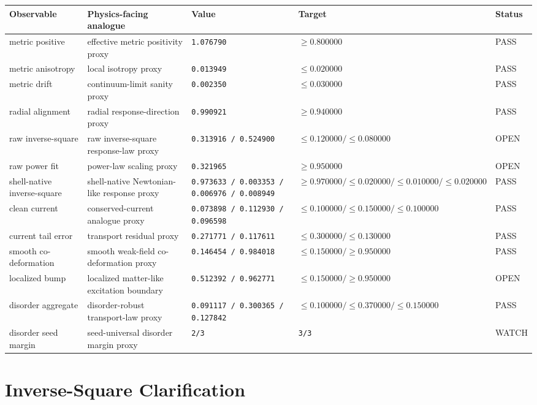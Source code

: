 \documentclass[11pt]{article}
\begin{document}
\begin{longtable}{@{}p{2.6cm}p{3.3cm}p{4.2cm}p{3.0cm}p{1.1cm}@{}}
\toprule
Observable & Physics-facing analogue & Value & Target & Status \\
\midrule
\endhead
metric positive & effective metric positivity proxy & \texttt{1.076790} & \(\ge 0.800000\) & PASS \\
metric anisotropy & local isotropy proxy & \texttt{0.013949} & \(\le 0.020000\) & PASS \\
metric drift & continuum-limit sanity proxy & \texttt{0.002350} & \(\le 0.030000\) & PASS \\
radial alignment & radial response-direction proxy & \texttt{0.990921} & \(\ge 0.940000\) & PASS \\
raw inverse-square & raw inverse-square response-law proxy & \texttt{0.313916 / 0.524900} & \(\le 0.120000 / \le 0.080000\) & OPEN \\
raw power fit & power-law scaling proxy & \texttt{0.321965} & \(\ge 0.950000\) & OPEN \\
shell-native inverse-square & shell-native Newtonian-like response proxy & \texttt{0.973633 / 0.003353 / 0.006976 / 0.008949} & \(\ge 0.970000 / \le 0.020000 / \le 0.010000 / \le 0.020000\) & PASS \\
clean current & conserved-current analogue proxy & \texttt{0.073898 / 0.112930 / 0.096598} & \(\le 0.100000 / \le 0.150000 / \le 0.100000\) & PASS \\
current tail error & transport residual proxy & \texttt{0.271771 / 0.117611} & \(\le 0.300000 / \le 0.130000\) & PASS \\
smooth co-deformation & smooth weak-field co-deformation proxy & \texttt{0.146454 / 0.984018} & \(\le 0.150000 / \ge 0.950000\) & PASS \\
localized bump & localized matter-like excitation boundary & \texttt{0.512392 / 0.962771} & \(\le 0.150000 / \ge 0.950000\) & OPEN \\
disorder aggregate & disorder-robust transport-law proxy & \texttt{0.091117 / 0.300365 / 0.127842} & \(\le 0.100000 / \le 0.370000 / \le 0.150000\) & PASS \\
disorder seed margin & seed-universal disorder margin proxy & \texttt{2/3} & \texttt{3/3} & WATCH \\
\bottomrule
\end{longtable}

\section{Inverse-Square Clarification}
\end{document}
